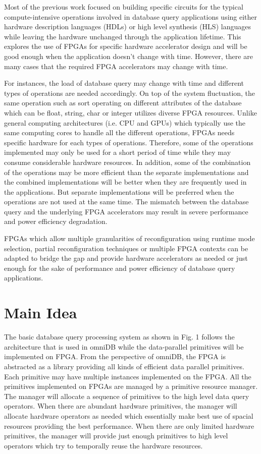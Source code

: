 \documentclass[12pt]{article} %
\begin{document}
Most of the previous work focused on building specific circuits for the typical
compute-intensive operations involved in database query applications using either hardware description languages
(HDLs) or high level synthesis (HLS) languages while leaving the hardware unchanged through the
application lifetime. This explores the use of FPGAs for specific hardware accelerator design
and will be good enough when the application doesn't change with time. However, there are many cases
that the required FPGA accelerators may change with time. 

For instances, the load of database query may change with time \cite{guotowards}
\cite{soundararajan2009dynamic} and different types of
operations are needed accordingly. On top of the system fluctuation, the same operation such as sort
operating on different attributes of the database which can be float, string, char or integer utilizes
diverse FPGA resources. Unlike general computing architectures (i.e. CPU and GPUs) which typically use the
same computing cores to handle all the different operations, FPGAs needs specific hardware for each
types of operations. Therefore, some of the operations implemented may only be used for a short period
of time while they may consume considerable hardware resources. In addition, some of the
combination of the operations may be more efficient than the separate implementations
\cite{sadoghi2012multi} \cite{chenaccelerating} and the combined
implementations will be better when they are frequently used in the applications. But separate
implementations will be preferred when the operations are not used at the same time. The mismatch
between the database query and the underlying FPGA accelerators may result in severe performance and power
efficiency degradation. 

FPGAs which allow multiple granularities of reconfiguration using runtime mode selection, partial reconfiguration
techniques or multiple FPGA contexts can be adapted to bridge the gap and provide hardware accelerators as needed or just enough for the sake of performance and power efficiency of database query applications.

\section{Main Idea}
The basic database query processing system as shown in Fig. 1 follows the architecture that is used
in omniDB \cite{zhang2013omnidb} while the data-parallel
primitives will be implemented on FPGA. From the perspective of omniDB, the FPGA is abstracted as a
library providing all kinds of efficient data parallel primitives. Each primitive may have multiple
instances implemented on the FPGA. All the primitives implemented on FPGAs are managed by a
primitive resource manager. The manager will allocate a sequence of primitives to the high level data query
operators. When there are abundant hardware primitives, the manager will allocate hardware operators
as needed which essentially make best use of spacial resources providing the best performance. When
there are only limited hardware primitives, the manager will provide just enough primitives to high
level operators which try to temporally reuse the hardware resources.   
\end{document}
